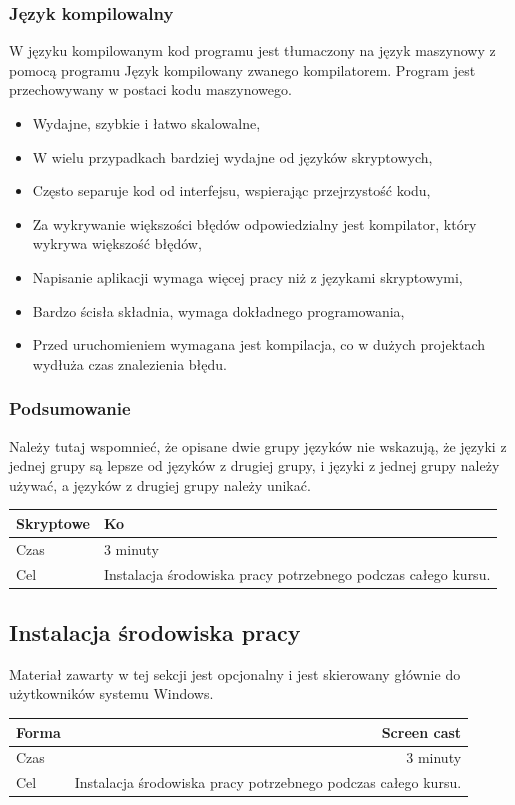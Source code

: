 \documentclass{mwart}
\newcommand*\tick{\item[\Checkmark]}
\newcommand*\fail{\item[\XSolidBrush]}
\begin{document}
\subsubsection{Język kompilowalny}
W języku kompilowanym kod programu jest tłumaczony na język maszynowy z pomocą programu
Język kompilowany
zwanego kompilatorem. Program jest przechowywany w postaci kodu maszynowego.
\begin{itemize}
    \tick Wydajne, szybkie i łatwo skalowalne,
    \tick W wielu przypadkach bardziej wydajne od języków skryptowych,
    \tick Często separuje kod od interfejsu, wspierając przejrzystość kodu,
    \tick Za wykrywanie większości błędów odpowiedzialny jest kompilator, który wykrywa
    większość błędów,
    \fail Napisanie aplikacji wymaga więcej pracy niż z językami skryptowymi,
    \fail Bardzo ścisła składnia, wymaga dokładnego programowania,
    \fail Przed uruchomieniem wymagana jest kompilacja, co w dużych projektach wydłuża czas
    znalezienia błędu.
\end{itemize}

\subsubsection{Podsumowanie}
Należy tutaj wspomnieć, że opisane dwie grupy języków nie wskazują, że języki z jednej
grupy są lepsze od języków z drugiej grupy, i języki z jednej grupy należy używać, a
języków z drugiej grupy należy unikać.

\begin{center}
  \begin{tabular}{ll}
    \toprule
    Skryptowe & Ko \\
    \midrule
    Czas & 3 minuty \\
    Cel & Instalacja środowiska pracy potrzebnego podczas całego kursu. \\
    \bottomrule
  \end{tabular}
\end{center}


\subsection{Instalacja środowiska pracy}

Materiał zawarty w tej sekcji jest opcjonalny i jest skierowany głównie do użytkowników systemu
Windows.
\begin{center}
  \begin{tabular}{lr}
    \toprule
    Forma & Screen cast \\
    \midrule
    Czas & 3 minuty \\
    Cel & Instalacja środowiska pracy potrzebnego podczas całego kursu. \\
    \bottomrule
  \end{tabular}
\end{center}
\end{document}
